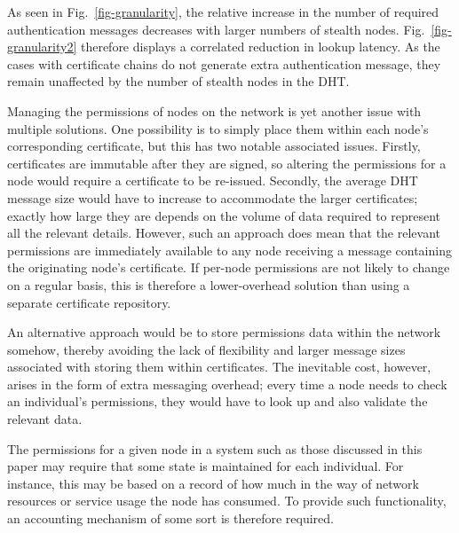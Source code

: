 \documentclass[times, 10pt,twocolumn]{article}
\begin{document}
As seen in Fig.~\ref{fig-granularity}, the relative increase in the
number of required authentication messages decreases with larger
numbers of stealth nodes. Fig.~\ref{fig-granularity2} therefore
displays a correlated reduction in lookup latency. As the cases with
certificate chains do not generate extra authentication message, they
remain unaffected by the number of stealth nodes in the DHT.

\label{subsect-permissions}

Managing the permissions of nodes on the network is yet another issue
with multiple solutions. One possibility is to simply place them within
each node's corresponding certificate, but this has two notable
associated issues. Firstly, certificates are immutable after they are
signed, so altering the permissions for a node would require a
certificate to be re-issued. Secondly, the average DHT message size
would have to increase to accommodate the larger certificates; exactly
how large they are depends on the volume of data required to represent
all the relevant details. However, such an approach does mean that the
relevant permissions are immediately available to any node receiving a
message containing the originating node's certificate. If per-node
permissions are not likely to change on a regular basis, this is
therefore a lower-overhead solution than using a separate certificate
repository.

An alternative approach would be to store permissions data within the
network somehow, thereby avoiding the lack of flexibility and larger
message sizes associated with storing them within certificates. The
inevitable cost, however, arises in the form of extra messaging
overhead; every time a node needs to check an individual's permissions,
they would have to look up and also validate the relevant data.

The permissions for a given node in a system such as those discussed in
this paper may require that some state is maintained for each
individual. For instance, this may be based on a record of how much in
the way of network resources or service usage the node has consumed. To
provide such functionality, an accounting mechanism of some sort is
therefore required.
\end{document}
